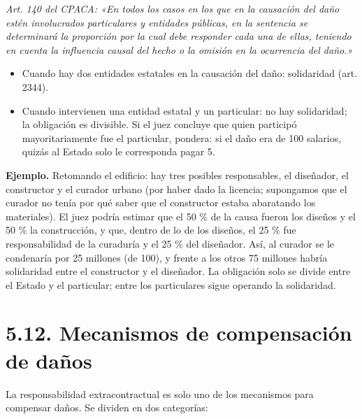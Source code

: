 \begin{cita}
\textit{Art. 140 del CPACA: «En todos los casos en los que en la causación del daño estén involucrados particulares y entidades públicas, en la sentencia se determinará la proporción por la cual debe responder cada una de ellas, teniendo en cuenta la influencia causal del hecho o la omisión en la ocurrencia del daño.»}
\end{cita}
\begin{itemize}
\item Cuando hay dos entidades estatales en la causación del daño: solidaridad (art. 2344).
\item Cuando intervienen una entidad estatal y un particular: no hay solidaridad; la obligación es divisible. Si el juez concluye que quien participó mayoritariamente fue el particular, pondera: si el daño era de 100 salarios, quizás al Estado solo le corresponda pagar 5.
\end{itemize}
\begin{ejemplo}
\textcolor[HTML]{4F6228}{\textbf{Ejemplo. }}Retomando el edificio: hay tres posibles responsables, el diseñador, el constructor y el curador urbano (por haber dado la licencia; supongamos que el curador no tenía por qué saber que el constructor estaba abaratando los materiales). El juez podría estimar que el 50 \% de la causa fueron los diseños y el 50 \% la construcción, y que, dentro de lo de los diseños, el 25 \% fue responsabilidad de la curaduría y el 25 \% del diseñador. Así, al curador se le condenaría por 25 millones (de 100), y frente a los otros 75 millones habría solidaridad entre el constructor y el diseñador. La obligación solo se divide entre el Estado y el particular; entre los particulares sigue operando la solidaridad.
\end{ejemplo}
\section{5.12. Mecanismos de compensación de daños}
La responsabilidad extracontractual es solo uno de los mecanismos para compensar daños. Se dividen en dos categorías:

